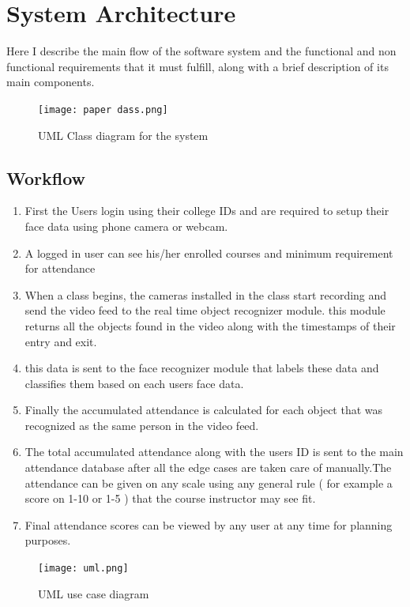 \documentclass[10pt,twocolumn,letterpaper]{article}
\begin{document}
\section{System Architecture}

Here I describe the main flow of the software system and the functional and non functional requirements that it must fulfill, along with a brief description of its main components.

\begin{figure}
    \centering
    \texttt{[image: paper dass.png]}
    \caption{UML Class diagram for the system}
    \label{fig:my_label}
\end{figure}
\subsection{Workflow}

\begin{enumerate}
    \item First the Users login using their college IDs and are required to setup their face data using phone camera or webcam.
    \item A logged in user can see his/her enrolled courses and minimum requirement for attendance
    \item When a class begins, the cameras installed in the class start recording and send the video feed to the real time object recognizer module. this module returns all the objects found in the video along with the timestamps of their entry and exit.
    \item this data is sent to the face recognizer module that labels these data and classifies them based on each users face data.
    \item Finally the accumulated attendance is calculated for each object that was recognized as the same person in the video feed.
    \item The total accumulated attendance along with the users ID is sent to the main attendance database after all the edge cases are taken care of manually.The attendance can be given on any scale using any general rule ( for example a score on 1-10 or 1-5 ) that the course instructor may see fit.
    \item Final attendance scores can be viewed by any user at any time for planning purposes.
\end{enumerate}


\begin{figure}
    \centering
    \texttt{[image: uml.png]}
    \caption{UML use case diagram}
    \label{fig:my_label}
\end{figure}
\end{document}
